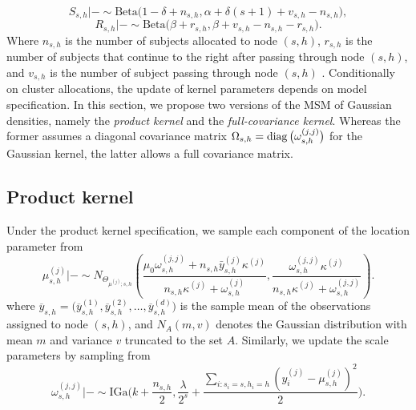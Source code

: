 \documentclass[nonatbib]{elsarticle}
\begin{document}
\begin{equation}
    \label{eq:gibbsSamplerUpdateClusterSsh}
    S_{s,h} | - \sim \text{Beta}\big(1 - \delta + n_{s,h}, \alpha + \delta(s+1) + v_{s,h} - n_{s,h} \big),
\end{equation}
\begin{equation}
    \label{eq:gibbsSamplerUpdateClusterRsh}
    R_{s,h} | - \sim \text{Beta}\big(\beta +  r_{s,h}, \beta + v_{s,h} - n_{s,h} - r_{s,h} \big).
\end{equation}
Where $n_{s,h}$ is the number of subjects allocated to node $(s,h)$, $r_{s,h}$ is the number of subjects that continue to the right after passing through node $(s,h)$, and $v_{s,h}$ is the number of subject passing through node $(s,h)$ \autocite{canale2016b}.
Conditionally on cluster allocations, the update of kernel parameters depends on model specification.
In this section, we propose two versions of the MSM of Gaussian densities, namely the \textit{product kernel} and the \textit{full-covariance kernel}.
Whereas the former assumes a diagonal covariance matrix $\Omega_{s,h} = \operatorname{diag} \big( \omega_{s,h}^{(j,j)} \big)$  for the Gaussian kernel, the latter allows a full covariance matrix.

\subsection{Product kernel}\label{ssec:product-kernel}
Under the product kernel specification, we sample each component of the location parameter from
\begin{equation}\label{eq:gibbsSamplerIndepMean}
    \mu_{s,h}^{(j)} | - \sim N_{\Theta_{\mu^{(j)}; s,h}} \left(\frac{\mu_0\omega^{(j, j)}_{s,h} + n_{s,h}\bar{y}^{(j)}_{s,h}\kappa^{(j)}}{n_{s,h}\kappa^{(j)} + \omega^{(j)}_{s,h}}, \frac{\omega^{(j,j)}_{s,h}\kappa^{(j)}}{n_{s,h}\kappa^{(j)} + \omega^{(j,j)}_{s,h}}\right).
\end{equation}
where $\overbar{y}_{s,h} = \big( \overbar{y}^{(1)}_{s,h}, \overbar{y}^{(2)}_{s,h}, \ldots, \overbar{y}^{(d)}_{s,h} \big)$ is the sample mean of the observations assigned to node $(s,h)$, and $N_{A}(m,v)$ denotes the Gaussian distribution with mean $m$ and variance $v$ truncated to the set $A$.
Similarly, we update the scale parameters by sampling from
\begin{equation}
    \label{eq:gibbsSamplerIndepScale}
    \omega_{s,h}^{(j, j)} | - \sim \text{IGa}\bigg( k + \frac{n_{s,h}}{2}, \frac{\lambda}{2^{s}} + \frac{\sum_{i : s_i = s, h_i=h}(y_i^{(j)} - \mu_{s,h}^{(j)})^2 }{2}  \bigg).
\end{equation}
\end{document}
